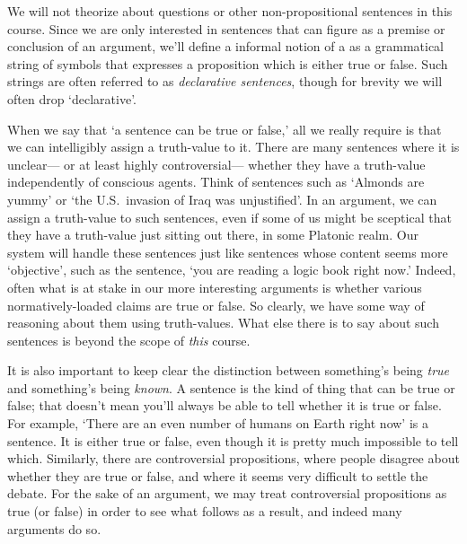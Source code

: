 We will not theorize about questions or other non-propositional sentences in this course.
Since we are only interested in sentences that can figure as a premise or conclusion of an argument, we'll define a informal notion of a  as a grammatical string of symbols that expresses a proposition which is either true or false.
Such strings are often referred to as \textit{declarative sentences}, though for brevity we will often drop `declarative'.

When we say that `a sentence can be true or false,' all we really require is that we can intelligibly assign a truth-value to it.
There are many sentences where it is unclear--- or at least highly controversial--- whether they have a truth-value independently of conscious agents.
Think of sentences such as `Almonds are yummy' or `the U.S.\ invasion of Iraq was unjustified'.
In an argument, we can assign a truth-value to such sentences, even if some of us might be sceptical that they have a truth-value just sitting out there, in some Platonic realm.
Our system will handle these sentences just like sentences whose content seems more `objective', such as the sentence, `you are reading a logic book right now.'
Indeed, often what is at stake in our more interesting arguments is whether various normatively-loaded claims are true or false.
So clearly, we have some way of reasoning about them using truth-values.
What else there is to say about such sentences is beyond the scope of \textit{this} course.


It is also important to keep clear the distinction between something's being \emph{true} and something's being \emph{known}.
A sentence is the kind of thing that can be true or false; that doesn't mean you'll always be able to tell whether it is true or false.
For example, `There are an even number of humans on Earth right now' is a sentence.
It is either true or false, even though it is pretty much impossible to tell which.
Similarly, there are controversial propositions, where people disagree about whether they are true or false, and where it seems very difficult to settle the debate.
For the sake of an argument, we may treat controversial propositions as true (or false) in order to see what follows as a result, and indeed many arguments do so. 

